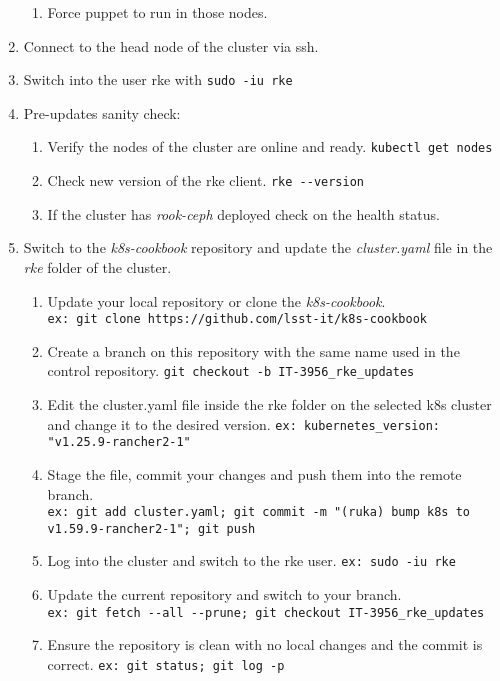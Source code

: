 \begin{enumerate}
\begin{enumerate}[label=(\alph*)]
    \item Force puppet to run in those nodes.
  \end{enumerate}
  \item Connect to the head node of the cluster via ssh.
  \item Switch into the user rke with \verb|sudo -iu rke|
  \item Pre-updates sanity check:
  \begin{enumerate}[label=(\alph*)]
    \item Verify the nodes of the cluster are online and ready. \verb|kubectl get nodes|
    \item Check new version of the rke client. \verb|rke --version|
    \item If the cluster has \textit{rook-ceph} deployed check on the health status.
  \end{enumerate}
  \item Switch to the \textit{k8s-cookbook} repository and update the \textit{cluster.yaml} file in the \textit{rke} folder of the cluster.
  \begin{enumerate}[label=(\alph*)]
    \item Update your local repository or clone the \textit{k8s-cookbook}.\\
      \verb|ex: git clone https://github.com/lsst-it/k8s-cookbook|
    \item Create a branch on this repository with the same name used in the control repository.
      \verb|git checkout -b IT-3956_rke_updates|
    \item Edit the cluster.yaml file inside the rke folder on the selected k8s cluster and change it to the desired version.
      \verb|ex: kubernetes_version: "v1.25.9-rancher2-1"|
    \item Stage the file, commit your changes and push them into the remote branch.\\
      \verb|ex: git add cluster.yaml; git commit -m "(ruka) bump k8s to v1.59.9-rancher2-1"; git push|
    \item Log into the cluster and switch to the rke user.
      \verb|ex: sudo -iu rke|
    \item Update the current repository and switch to your branch.\\
      \verb|ex: git fetch --all --prune; git checkout IT-3956_rke_updates|
    \item Ensure the repository is clean with no local changes and the commit is correct.
      \verb|ex: git status; git log -p|
  \end{enumerate}

\end{enumerate}
